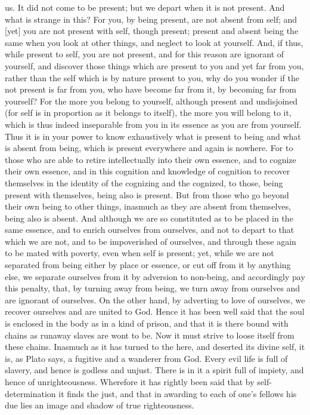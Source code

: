 \documentclass[12pt]{article}
\begin{document}
us. It did not come to be present; but we depart when it is not present. And
what is strange in this? For you, by being present, are not absent from self;
and [yet] you are not present with self, though present; present and absent
being the same when you look at other things, and neglect to look at yourself.
And, if thus, while present to self, you are not present, and for this reason
are ignorant of yourself, and discover those things which are present to you
and yet far from you, rather than the self which is by nature present to you,
why do you wonder if the not present is far from you, who have become far from
it, by becoming far from yourself? For the more you belong to yourself,
although present and undisjoined (for self is in proportion as it belongs to
itself), the more you will belong to it, which is thus indeed inseparable from
you in its es\-sence as you are from yourself. Thus it is in your power to know
exhaustively what is present to being and what is absent from being, which is
present everywhere and again is nowhere. For to those who are able to retire
intellectually into their own es\-sence, and to cognize their own es\-sence,
and in this cognition and knowledge of cognition to recover themselves in the
identity of the cognizing and the cognized, to those, being present with
themselves, being also is present. But from those who go beyond their own being
to other things, inasmuch as they are absent from themselves, being also is
absent. And although we are so constituted as to be placed in the same
es\-sence, and to enrich ourselves from ourselves, and not to depart to that
which we are not, and to be impoverished of ourselves, and through these again
to be mated with poverty, even when self is present; yet, while we are not
separated from being either by place or es\-sence, or cut off from it by
anything else, we separate ourselves from it by adversion to non-being, and
accordingly pay this penalty, that, by turning away from being, we turn away
from ourselves and are ignorant of ourselves. On the other hand, by adverting
to love of ourselves, we recover ourselves and are united to God. Hence it has
been well said that the soul is enclosed in the body as in a kind of prison,
and that it is there bound with chains as runaway slaves are wont to be. Now it
must strive to loose itself from these chains. Inasmuch as it has turned to the
here, and deserted its divine self, it is, as Plato says, a fugitive and a
wanderer from God. Every evil life is full of slavery, and hence is godless
and unjust. There is in it a spirit full of impiety, and hence of
unrighteousness. Wherefore it has rightly been said that by self-determination
it finds the just, and that in awarding to each of one's fellows his due lies
an image and shadow of true righteousness.
\end{document}
